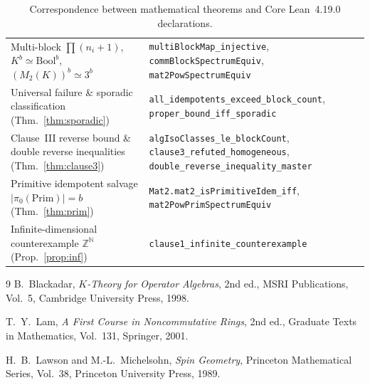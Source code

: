 \documentclass[11pt,a4paper]{article}
\theoremstyle{definition}
\newcommand{\Z}{\mathbb{Z}}
\newcommand{\N}{\mathbb{N}}
\newcommand{\Prim}{\mathrm{Prim}}
\begin{document}
\begin{table}[!ht]
\begin{tabular}{|>{\raggedright\arraybackslash}p{}|>{\raggedright\arraybackslash}p{}|}
Multi-block $\prod(n_i+1)$, $K^b\simeq\mathrm{Bool}^b$, $(M_2(K))^b\simeq 3^b$ &
  \texttt{multiBlockMap\_injective}, \texttt{commBlockSpectrumEquiv}, \texttt{mat2PowSpectrumEquiv} \\
Universal failure \& sporadic classification (Thm.~\ref{thm:sporadic}) &
  \texttt{all\_idempotents\_exceed\_block\_count}, \texttt{proper\_bound\_iff\_sporadic} \\
Clause~III reverse bound \& double reverse inequalities (Thm.~\ref{thm:clause3}) &
  \texttt{algIsoClasses\_le\_blockCount}, \texttt{clause3\_refuted\_homogeneous}, \texttt{double\_reverse\_inequality\_master} \\
Primitive idempotent salvage $|\pi_0(\Prim)|=b$ (Thm.~\ref{thm:prim}) &
  \texttt{Mat2.mat2\_isPrimitiveIdem\_iff}, \texttt{mat2PowPrimSpectrumEquiv} \\
Infinite-dimensional counterexample $\Z^\N$ (Prop.~\ref{prop:inf}) &
  \texttt{clause1\_infinite\_counterexample} \\
\hline
\end{tabular}
\caption{Correspondence between mathematical theorems and Core Lean~4.19.0 declarations.}
\label{tab:lean}
\end{table}

\clearpage
\begin{thebibliography}{9}
B.~Blackadar, \emph{$K$-Theory for Operator Algebras}, 2nd ed., MSRI Publications, Vol.~5,
Cambridge University Press, 1998.

T.~Y.~Lam, \emph{A First Course in Noncommutative Rings}, 2nd ed., Graduate Texts in
Mathematics, Vol.~131, Springer, 2001.

H.~B.~Lawson and M.-L.~Michelsohn, \emph{Spin Geometry}, Princeton Mathematical Series,
Vol.~38, Princeton University Press, 1989.
\end{thebibliography}
\end{document}

